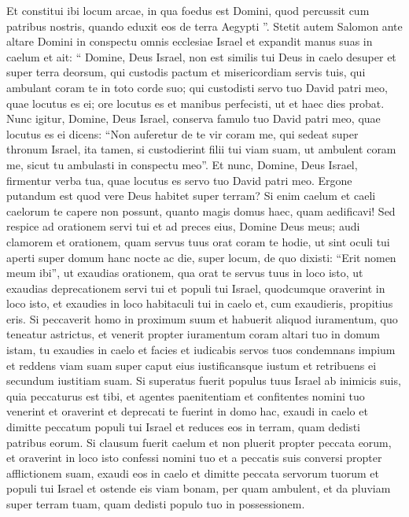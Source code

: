 \begin{biblechapter}
\begin{biblechapter}
\begin{biblechapter}
\begin{biblechapter}
\begin{biblechapter}
\begin{biblechapter}
\begin{biblechapter}
\begin{biblechapter}
\verse Et constitui ibi locum arcae, in qua foedus est Domini, quod percussit cum patribus nostris, quando eduxit eos de terra Aegypti ”.
 \verse Stetit autem Salomon ante altare Domini in conspectu omnis ecclesiae Israel et expandit manus suas in caelum 
\verse et ait: “ Domine, Deus Israel, non est similis tui Deus in caelo desuper et super terra deorsum, qui custodis pactum et misericordiam servis tuis, qui ambulant coram te in toto corde suo; 
\verse qui custodisti servo tuo David patri meo, quae locutus es ei; ore locutus es et manibus perfecisti, ut et haec dies probat. 
\verse Nunc igitur, Domine, Deus Israel, conserva famulo tuo David patri meo, quae locutus es ei dicens: “Non auferetur de te vir coram me, qui sedeat super thronum Israel, ita tamen, si custodierint filii tui viam suam, ut ambulent coram me, sicut tu ambulasti in conspectu meo”. 
\verse Et nunc, Domine, Deus Israel, firmentur verba tua, quae locutus es servo tuo David patri meo. 
\verse Ergone putandum est quod vere Deus habitet super terram? Si enim caelum et caeli caelorum te capere non possunt, quanto magis domus haec, quam aedificavi! 
\verse Sed respice ad orationem servi tui et ad preces eius, Domine Deus meus; audi clamorem et orationem, quam servus tuus orat coram te hodie, 
\verse ut sint oculi tui aperti super domum hanc nocte ac die, super locum, de quo dixisti: “Erit nomen meum ibi”, ut exaudias orationem, qua orat te servus tuus in loco isto, 
\verse ut exaudias deprecationem servi tui et populi tui Israel, quodcumque oraverint in loco isto, et exaudies in loco habitaculi tui in caelo et, cum exaudieris, propitius eris.
 \verse Si peccaverit homo in proximum suum et habuerit aliquod iuramentum, quo teneatur astrictus, et venerit propter iuramentum coram altari tuo in domum istam, 
\verse tu exaudies in caelo et facies et iudicabis servos tuos condemnans impium et reddens viam suam super caput eius iustificansque iustum et retribuens ei secundum iustitiam suam.
 \verse Si superatus fuerit populus tuus Israel ab inimicis suis, quia peccaturus est tibi, et agentes paenitentiam et confitentes nomini tuo venerint et oraverint et deprecati te fuerint in domo hac, 
\verse exaudi in caelo et dimitte peccatum populi tui Israel et reduces eos in terram, quam dedisti patribus eorum.
 \verse Si clausum fuerit caelum et non pluerit propter peccata eorum, et oraverint in loco isto confessi nomini tuo et a peccatis suis conversi propter afflictionem suam, 
\verse exaudi eos in caelo et dimitte peccata servorum tuorum et populi tui Israel et ostende eis viam bonam, per quam ambulent, et da pluviam super terram tuam, quam dedisti populo tuo in possessionem.

\end{biblechapter}
\end{biblechapter}
\end{biblechapter}
\end{biblechapter}
\end{biblechapter}
\end{biblechapter}
\end{biblechapter}
\end{biblechapter}
